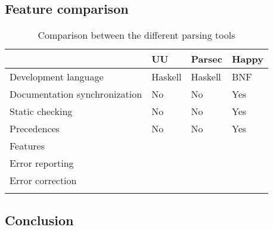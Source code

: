 \subsection{Feature comparison}
\begin{longtable}{|l|l|l|l|}\hline
	\textbf{} & \textbf{UU} & \textbf{Parsec} & \textbf{Happy} \\\hline
	\endhead
	
	Development language 	  & Haskell & Haskell & BNF \\\hline
	Documentation synchronization  & No & No & Yes \\\hline
	Static checking			  & No & No & Yes \\\hline
	Precedences & No & No & Yes \\\hline
	Features & & & \\\hline
	Error reporting & & & \\\hline
	Error correction & & & \\\hline
	
	\caption{Comparison between the different parsing tools}
	\label{tab:comparison}
\end{longtable}

\subsection{Conclusion}

